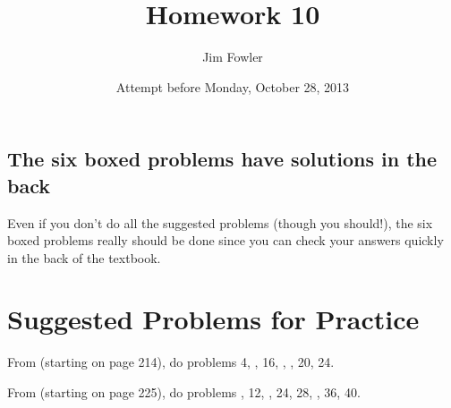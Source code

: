 \documentclass[12pt]{handout}
\title{Homework 10}
\date{Attempt before Monday, October 28, 2013}
\author{Jim Fowler}
\begin{document}
\maketitle










\subsection*{The six boxed problems have solutions in the back}
Even if you don't do all the suggested problems (though you should!), the six boxed problems really should be done since you can check your answers quickly in the back of the textbook.

\section*{Suggested Problems for Practice}

From  (starting on page 214),
do problems 4, , 16, , , 20, 24.
\vspace{1ex}

From  (starting on page 225),
do problems , 12, , 24, 28, , 36, 40.
\vspace{1ex}
\end{document}

